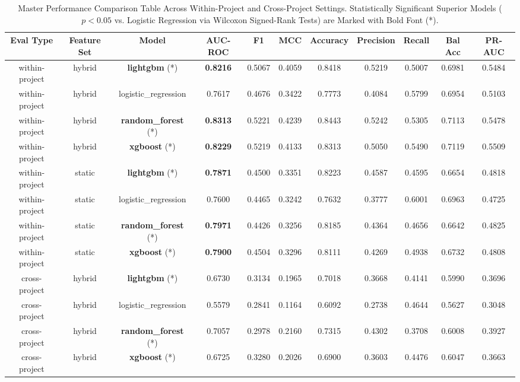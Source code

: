 \documentclass[10pt,journal,compsoc]{IEEEtran}
\begin{document}
\begin{table}[t]
\centering
\caption{Master Performance Comparison Table Across Within-Project and Cross-Project Settings. Statistically Significant Superior Models ($p < 0.05$ vs. Logistic Regression via Wilcoxon Signed-Rank Tests) are Marked with Bold Font (*).}
\label{tab:master_results}
\begin{tabular}{ccccccccccc}
\toprule
\textbf{Eval Type} & \textbf{Feature Set} & \textbf{Model} & \textbf{AUC-ROC} & \textbf{F1} & \textbf{MCC} & \textbf{Accuracy} & \textbf{Precision} & \textbf{Recall} & \textbf{Bal Acc} & \textbf{PR-AUC} \\
\midrule
within-project & hybrid & \textbf{lightgbm} (*) & \textbf{0.8216} & 0.5067 & 0.4059 & 0.8418 & 0.5219 & 0.5007 & 0.6981 & 0.5484 \\
within-project & hybrid & logistic_regression & 0.7617 & 0.4676 & 0.3422 & 0.7773 & 0.4084 & 0.5799 & 0.6954 & 0.5103 \\
within-project & hybrid & \textbf{random_forest} (*) & \textbf{0.8313} & 0.5221 & 0.4239 & 0.8443 & 0.5242 & 0.5305 & 0.7113 & 0.5478 \\
within-project & hybrid & \textbf{xgboost} (*) & \textbf{0.8229} & 0.5219 & 0.4133 & 0.8313 & 0.5050 & 0.5490 & 0.7119 & 0.5509 \\
within-project & static & \textbf{lightgbm} (*) & \textbf{0.7871} & 0.4500 & 0.3351 & 0.8223 & 0.4587 & 0.4595 & 0.6654 & 0.4818 \\
within-project & static & logistic_regression & 0.7600 & 0.4465 & 0.3242 & 0.7632 & 0.3777 & 0.6001 & 0.6963 & 0.4725 \\
within-project & static & \textbf{random_forest} (*) & \textbf{0.7971} & 0.4426 & 0.3256 & 0.8185 & 0.4364 & 0.4656 & 0.6642 & 0.4825 \\
within-project & static & \textbf{xgboost} (*) & \textbf{0.7900} & 0.4504 & 0.3296 & 0.8111 & 0.4269 & 0.4938 & 0.6732 & 0.4808 \\
cross-project & hybrid & \textbf{lightgbm} (*) & 0.6730 & 0.3134 & 0.1965 & 0.7018 & 0.3668 & 0.4141 & 0.5990 & 0.3696 \\
cross-project & hybrid & logistic_regression & 0.5579 & 0.2841 & 0.1164 & 0.6092 & 0.2738 & 0.4644 & 0.5627 & 0.3048 \\
cross-project & hybrid & \textbf{random_forest} (*) & 0.7057 & 0.2978 & 0.2160 & 0.7315 & 0.4302 & 0.3708 & 0.6008 & 0.3927 \\
cross-project & hybrid & \textbf{xgboost} (*) & 0.6725 & 0.3280 & 0.2026 & 0.6900 & 0.3603 & 0.4476 & 0.6047 & 0.3663 \\

\end{tabular}
\end{table}
\end{document}
